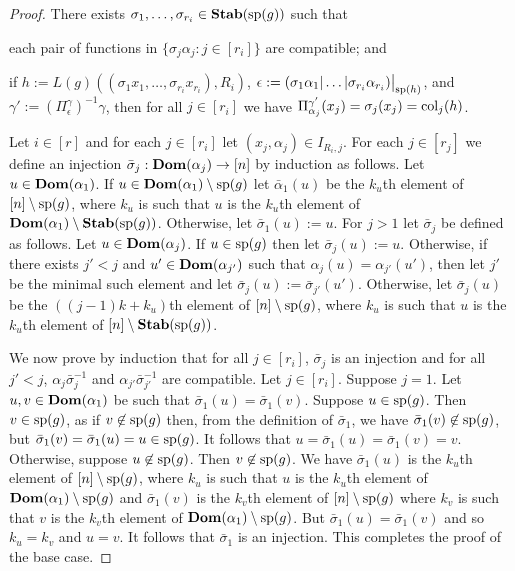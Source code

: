 \documentclass[../main/thesis.tex]{subfiles}
\begin{document}
\begin{proof}
  There exists $\sigma_1, \ldots, \sigma_{r_i} \in \text{\textbf{Stab}} (\text{sp} (g))$ such that
  \vspace{-1.5mm}
  \begin{myenum}
  \item\label{lem:defining-h-from-index--obj:1}each pair of functions in
    $\{\sigma_j \alpha_j : j \in [r_i]\}$ are compatible; and
  \item\label{lem:defining-h-from-index--obj:2}if $h := L(g)((\sigma_1 x_1,
    \ldots, \sigma_{r_i} x_{r_i}), R_i)$, $\epsilon := \restr{(\sigma_1 \alpha_1
      \vert \ldots \vert \sigma_{r_i} \alpha_{r_i})}{\consp(h)}$, and $\gamma'
    := (\Pi^{\gamma}_\epsilon)^{-1}\gamma$, then for all $j \in [r_i]$ we have
    $\Pi^{\gamma'}_{\alpha_j}(x_j) = \sigma_j (x_j) = \text{\upshape col}_{j}(h)$.
  \end{myenum}

  Let $i \in [r]$ and for each $j \in [r_i]$ let $(x_j, \alpha_j) \in I_{R_i,
    j}$. For each $j \in [r_j]$ we define an injection $\bar{\sigma}_j :
  \text{\textbf{Dom}}(\alpha_j) \rightarrow [n]$ by induction as follows. Let $u \in \text{\textbf{Dom}} (\alpha_1)$.
  If $u \in \text{\textbf{Dom}}(\alpha_1) \setminus \text{sp}(g)$ let $\bar{\alpha}_1 (u)$ be the
  $k_u$th element of $[n] \setminus \text{sp}(g)$, where $k_u$ is such that $u$ is
  the $k_u$th element of $\text{\textbf{Dom}}(\alpha_1) \setminus \text{\textbf{Stab}} (\text{sp} (g))$. Otherwise, let
  $\bar{\sigma}_1 (u) := u$. For $j > 1$ let $\bar{\sigma}_j$ be defined as
  follows. Let $u \in \text{\textbf{Dom}} (\alpha_j)$. If $u \in \text{sp}(g)$ then let
  $\bar{\sigma}_j(u) := u$. Otherwise, if there exists $j' < j$ and $u' \in \text{\textbf{Dom}}
  (\alpha_{j'})$ such that $\alpha_j (u) = \alpha_{j'}(u')$, then let $j'$ be
  the minimal such element and let $\bar{\sigma}_j (u) :=
  \bar{\sigma}_{j'}(u')$. Otherwise, let $\bar{\sigma}_j (u)$ be the $((j - 1)k
  + k_u)$th element of $[n] \setminus \text{sp}(g)$, where $k_u$ is such that $u$
  is the $k_u$th element of $[n] \setminus \text{\textbf{Stab}} (\text{sp} (g))$.

  We now prove by induction that for all $j \in [r_i]$, $\bar{\sigma}_j$ is an
  injection and for all $j' < j$, $\alpha_j \bar{\sigma}^{-1}_j$ and
  $\alpha_{j'} \bar{\sigma}^{-1}_{j'}$ are compatible. Let $j \in [r_i]$.
  Suppose $j = 1$. Let $u, v \in \text{\textbf{Dom}}(\alpha_1)$ be such that $\bar{\sigma}_1(u)
  = \bar{\sigma}_1(v)$. Suppose $u \in \text{sp}(g)$. Then $v \in \text{sp}(g)$, as if
  $v \not\in \text{sp}(g)$ then, from the definition of $\bar{\sigma}_1$, we have
  $\bar{\sigma}_1 (v) \not\in \text{sp}(g)$, but $\bar{\sigma}_1(v) =
  \bar{\sigma}_1(u) = u \in \text{sp}(g)$. It follows that $u = \bar{\sigma}_1(u) =
  \bar{\sigma}_1(v) = v$. Otherwise, suppose $u \not\in \text{sp}(g)$. Then $v
  \not\in \text{sp}(g)$. We have $\bar{\sigma}_1(u)$ is the $k_u$th element of $[n]
  \setminus \text{sp}(g)$, where $k_u$ is such that $u$ is the $k_u$th element of
  $\text{\textbf{Dom}}(\alpha_1) \setminus \text{sp}(g)$ and $\bar{\sigma}_1(v)$ is the $k_v$th
  element of $[n] \setminus \text{sp}(g)$ where $k_v$ is such that $v$ is the
  $k_v$th element of $\text{\textbf{Dom}}(\alpha_1) \setminus \text{sp}(g)$. But
  $\bar{\sigma}_1(u) = \bar{\sigma}_1 (v)$ and so $k_u = k_v$ and $u = v$. It
  follows that $\bar{\sigma}_1$ is an injection. This completes the proof of the
  base case.


\end{proof}
\end{document}
